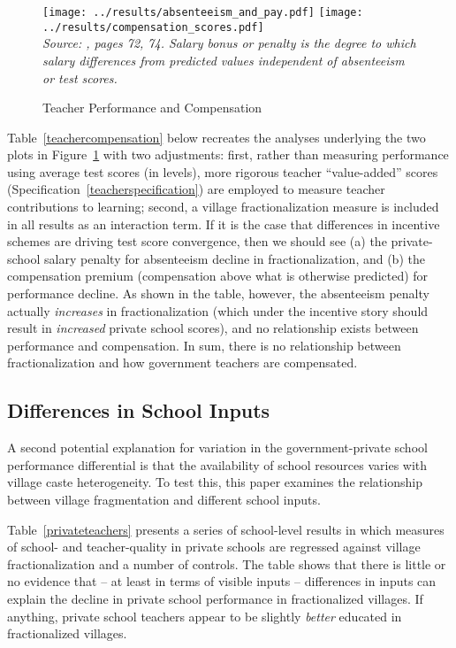\documentclass[Eubank_pk_ethnic_sorting.tex]{subfiles}
\begin{document}
\begin{figure}[htb]
	\begin{center}
	\caption{Teacher Performance and Compensation}\label{payandabsenteeism}
	\texttt{[image: ../results/absenteeism\_and\_pay.pdf]} \texttt{[image: ../results/compensation\_scores.pdf]}\\
	\emph{Source: \cite{Andrabi:2007we}, pages 72, 74. Salary bonus or penalty is the degree to which salary differences from predicted values independent of absenteeism or test scores.}
	\end{center}
\end{figure}

Table~\ref{teachercompensation} below recreates the analyses underlying the two plots in Figure~\ref{payandabsenteeism} with two adjustments: first, rather than measuring performance using average test scores (in levels), more rigorous teacher ``value-added'' scores (Specification~\ref{teacherspecification}) are employed to measure teacher contributions to learning; second, a village fractionalization measure is included in all results as an interaction term. If it is the case that differences in incentive schemes are driving test score convergence, then we should see (a) the private-school salary penalty for absenteeism decline in fractionalization, and (b) the compensation premium (compensation above what is otherwise predicted) for performance decline. As shown in the table, however, the absenteeism penalty actually \emph{increases} in fractionalization (which under the incentive story should result in \emph{increased} private school scores), and no relationship exists between performance and compensation. In sum, there is no relationship between fractionalization and how government teachers are compensated.





\subsection{Differences in School Inputs}

A second potential explanation for variation in the government-private school performance differential is that the availability of school resources varies with village caste heterogeneity. To test this, this paper examines the relationship between village fragmentation and different school inputs.

Table~\ref{privateteachers} presents a series of school-level results in which measures of school- and teacher-quality in private schools are regressed against village fractionalization and a number of controls. The table shows that there is little or no evidence that -- at least in terms of visible inputs -- differences in inputs can explain the decline in private school performance in fractionalized villages. If anything, private school teachers appear to be slightly \emph{better} educated in fractionalized villages.

\end{document}
